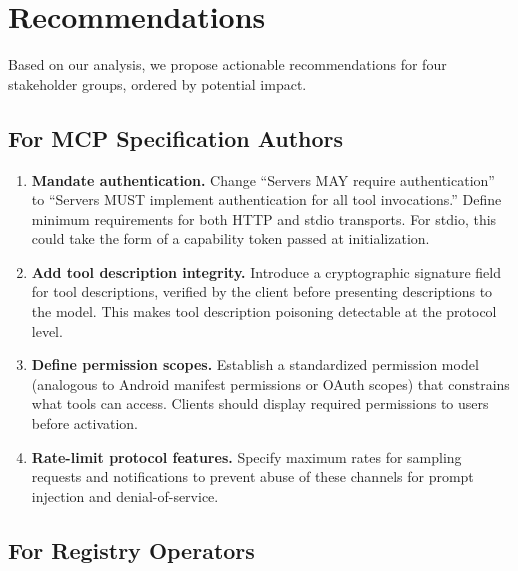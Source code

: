 \documentclass[11pt,twocolumn]{article}
\begin{document}
\section{Recommendations}
\label{sec:recommendations}

Based on our analysis, we propose actionable recommendations for four stakeholder groups, ordered by potential impact.

\subsection{For MCP Specification Authors}

\begin{enumerate}[leftmargin=*]
    \item \textbf{Mandate authentication.} Change ``Servers MAY require authentication'' to ``Servers MUST implement authentication for all tool invocations.'' Define minimum requirements for both HTTP and stdio transports. For stdio, this could take the form of a capability token passed at initialization.
    \item \textbf{Add tool description integrity.} Introduce a cryptographic signature field for tool descriptions, verified by the client before presenting descriptions to the model. This makes tool description poisoning detectable at the protocol level.
    \item \textbf{Define permission scopes.} Establish a standardized permission model (analogous to Android manifest permissions or OAuth scopes) that constrains what tools can access. Clients should display required permissions to users before activation.
    \item \textbf{Rate-limit protocol features.} Specify maximum rates for sampling requests and notifications to prevent abuse of these channels for prompt injection and denial-of-service.
\end{enumerate}

\subsection{For Registry Operators}
\end{document}

